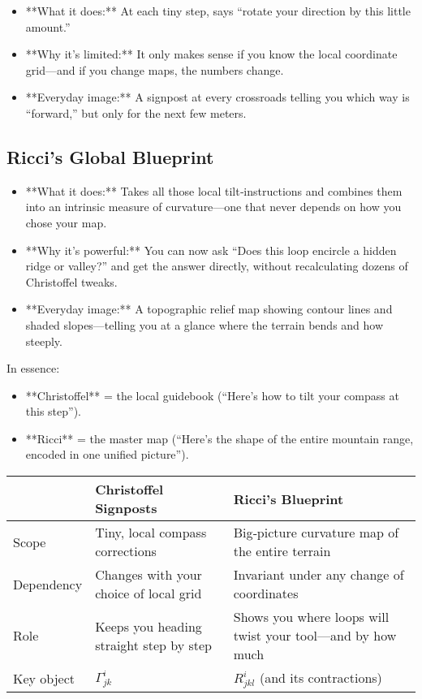 \begin{itemize}
    \item **What it does:**  At each tiny step, says “rotate your direction by this little amount.”  
    \item **Why it’s limited:**  It only makes sense if you know the local coordinate grid—and if you change maps, the numbers change.  
    \item **Everyday image:**  A signpost at every crossroads telling you which way is “forward,” but only for the next few meters.
\end{itemize}

\subsection{Ricci’s Global Blueprint}

\begin{itemize}
    \item **What it does:**  Takes all those local tilt‐instructions and combines them into an intrinsic measure of curvature—one that never depends on how you chose your map.  
    \item **Why it’s powerful:**  You can now ask “Does this loop encircle a hidden ridge or valley?” and get the answer directly, without recalculating dozens of Christoffel tweaks.  
    \item **Everyday image:**  A topographic relief map showing contour lines and shaded slopes—telling you at a glance where the terrain bends and how steeply.
\end{itemize}

\medskip
In essence:

\begin{itemize}
  \item **Christoffel** = the local guidebook (“Here’s how to tilt your compass at this step”).  
  \item **Ricci** = the master map (“Here’s the shape of the entire mountain range, encoded in one unified picture”).  
\end{itemize}

\begin{tcolorbox}[colback=gray!5!white,colframe=black,title=\textbf{Trail Markers vs.\ Landscape Map}, fonttitle=\bfseries, arc=1.5mm, boxrule=0.4pt]
\begin{tabular}{p{4cm} p{5.5cm} p{5.5cm}}
 & \textbf{Christoffel Signposts} & \textbf{Ricci’s Blueprint} \\
\midrule
Scope & Tiny, local compass corrections & Big‐picture curvature map of the entire terrain \\
Dependency & Changes with your choice of local grid & Invariant under any change of coordinates \\
Role & Keeps you heading straight step by step & Shows you where loops will twist your tool—and by how much \\
Key object & \(\Gamma^i_{jk}\) & \(R^i_{jkl}\) (and its contractions) \\
\end{tabular}
\end{tcolorbox}

